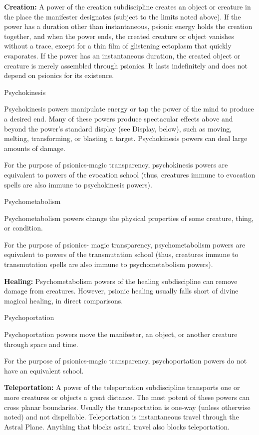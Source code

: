 \documentclass{article}
\begin{document}
\textbf{Creation:} A power of the creation subdiscipline creates an object or creature 
in the place the manifester designates (subject to the limits noted above). If 
the power has a duration other than instantaneous, psionic energy holds the creation 
together, and when the power ends, the created creature or object vanishes without 
a trace, except for a thin film of glistening ectoplasm that quickly evaporates. 
If the power has an instantaneous duration, the created object or creature is merely 
assembled through psionics. It lasts indefinitely and does not depend on psionics 
for its existence.

\vspace{12pt}
Psychokinesis

Psychokinesis powers manipulate energy or tap the power of the mind to produce 
a desired end. Many of these powers produce spectacular effects above and beyond 
the power's standard display (see Display, below), such as moving, melting, transforming, 
or blasting a target. Psychokinesis powers can deal large amounts of damage.

For the purpose of psionics-magic transparency, psychokinesis powers are equivalent 
to powers of the evocation school (thus, creatures immune to evocation spells are 
also immune to psychokinesis powers).

\vspace{12pt}
Psychometabolism

Psychometabolism powers change the physical properties of some creature, thing, 
or condition. 

For the purpose of psionics- magic transparency, psychometabolism powers are equivalent 
to powers of the transmutation school (thus, creatures immune to transmutation 
spells are also immune to psychometabolism powers).

\textbf{Healing:} Psychometabolism powers of the healing subdiscipline can remove 
damage from creatures. However, psionic healing usually falls short of divine magical 
healing, in direct comparisons. 

\vspace{12pt}
Psychoportation

Psychoportation powers move the manifester, an object, or another creature through 
space and time.

For the purpose of psionics-magic transparency, psychoportation powers do not have 
an equivalent school.

\textbf{Teleportation:} A power of the teleportation subdiscipline transports one 
or more creatures or objects a great distance. The most potent of these powers 
can cross planar boundaries. Usually the transportation is one-way (unless otherwise 
noted) and not dispellable. Teleportation is instantaneous travel through the Astral 
Plane. Anything that blocks astral travel also blocks teleportation.
\end{document}
